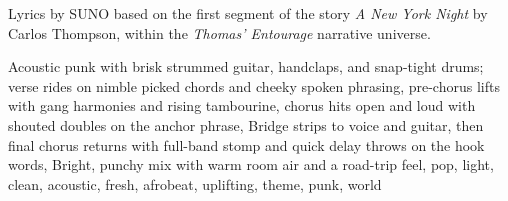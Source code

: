 
\begin{notes}
Lyrics by SUNO based on the first segment of the story \emph{A New York Night} by Carlos Thompson, %
within the \emph{Thomas’ Entourage} narrative universe.
\end{notes}
\begin{style}
Acoustic punk with brisk strummed guitar, handclaps, and snap-tight drums; verse rides on nimble picked chords and cheeky spoken phrasing, pre-chorus lifts with gang harmonies and rising tambourine, chorus hits open and loud with shouted doubles on the anchor phrase, Bridge strips to voice and guitar, then final chorus returns with full-band stomp and quick delay throws on the hook words, Bright, punchy mix with warm room air and a road-trip feel, pop, light, clean, acoustic, fresh, afrobeat, uplifting, theme, punk, world
\end{style}
